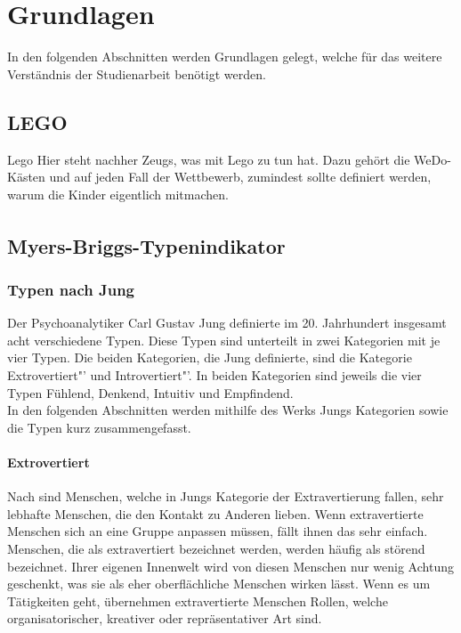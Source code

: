 \chapter{Grundlagen}

In den folgenden Abschnitten werden Grundlagen gelegt, welche für das weitere Verständnis der Studienarbeit benötigt werden.

\section{LEGO}
\gls{Lego}
Hier steht nachher Zeugs, was mit Lego zu tun hat. Dazu gehört die WeDo-Kästen und auf jeden Fall der Wettbewerb, zumindest sollte definiert werden, warum die Kinder eigentlich mitmachen.

\section{Myers-Briggs-Typenindikator\textsuperscript{\textregistered}} 
\subsection{Typen nach Jung}
Der Psychoanalytiker Carl Gustav Jung definierte im 20. Jahrhundert insgesamt acht verschiedene Typen. Diese Typen sind unterteilt in zwei Kategorien mit je vier Typen. Die beiden Kategorien, die Jung definierte, sind die Kategorie \glqq Extrovertiert"' und \glqq Introvertiert"'. In beiden Kategorien sind jeweils die vier Typen Fühlend, Denkend, Intuitiv und Empfindend. \cite{jung_1921}\\

In den folgenden Abschnitten werden mithilfe des Werks  Jungs Kategorien sowie die Typen kurz zusammengefasst.
\subsubsection{Extrovertiert}
Nach \citeauthor{jung_2014} sind Menschen, welche in Jungs Kategorie der Extravertierung
fallen, sehr lebhafte Menschen, die den Kontakt zu Anderen lieben. Wenn extravertierte Menschen sich an eine Gruppe anpassen müssen, fällt ihnen das sehr einfach. Menschen, die als extravertiert bezeichnet werden, werden häufig als störend bezeichnet. Ihrer eigenen Innenwelt wird von diesen Menschen nur wenig Achtung geschenkt, was sie als eher oberflächliche Menschen wirken lässt. Wenn es um Tätigkeiten geht, übernehmen extravertierte Menschen Rollen, welche organisatorischer, kreativer oder repräsentativer Art sind. 

